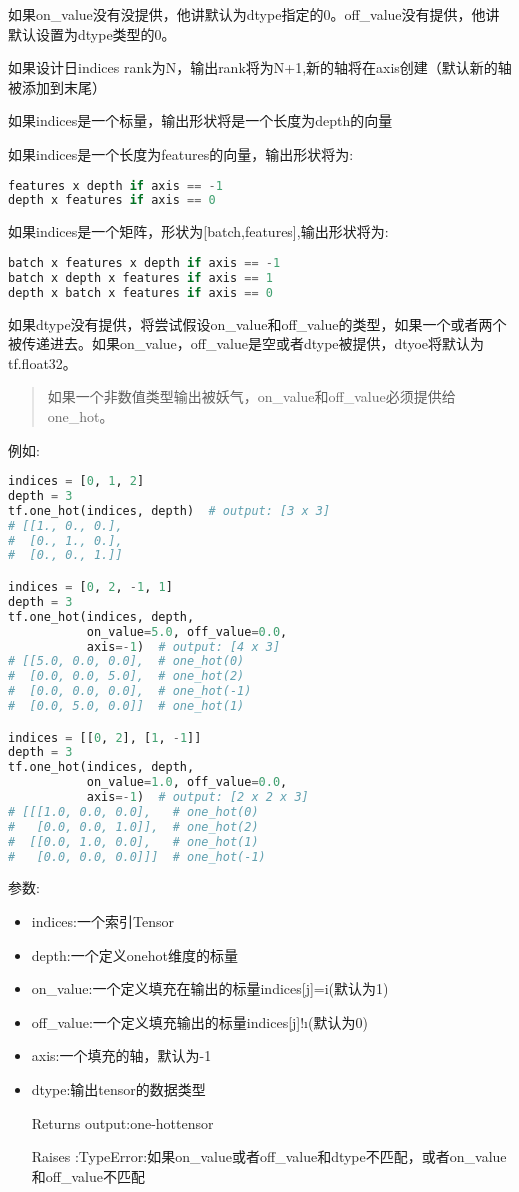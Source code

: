 如果on\_value没有没提供，他讲默认为dtype指定的0。off\_value没有提供，他讲默认设置为dtype类型的0。

如果设计日indices rank为N，输出rank将为N+1,新的轴将在axis创建（默认新的轴被添加到末尾）

如果indices是一个标量，输出形状将是一个长度为depth的向量

如果indices是一个长度为features的向量，输出形状将为:
\begin{lstlisting}[language=Python]
features x depth if axis == -1
depth x features if axis == 0
\end{lstlisting}
如果indices是一个矩阵，形状为[batch,features],输出形状将为:
\begin{lstlisting}[language=Python]
batch x features x depth if axis == -1
batch x depth x features if axis == 1
depth x batch x features if axis == 0
\end{lstlisting}
如果dtype没有提供，将尝试假设on\_value和off\_value的类型，如果一个或者两个被传递进去。如果on\_value，off\_value是空或者dtype被提供，dtyoe将默认为tf.float32。
\begin{quote}
如果一个非数值类型输出被妖气，on\_value和off\_value必须提供给one\_hot。
\end{quote}

例如:
\begin{lstlisting}[language=Python]
indices = [0, 1, 2]
depth = 3
tf.one_hot(indices, depth)  # output: [3 x 3]
# [[1., 0., 0.],
#  [0., 1., 0.],
#  [0., 0., 1.]]

indices = [0, 2, -1, 1]
depth = 3
tf.one_hot(indices, depth,
           on_value=5.0, off_value=0.0,
           axis=-1)  # output: [4 x 3]
# [[5.0, 0.0, 0.0],  # one_hot(0)
#  [0.0, 0.0, 5.0],  # one_hot(2)
#  [0.0, 0.0, 0.0],  # one_hot(-1)
#  [0.0, 5.0, 0.0]]  # one_hot(1)

indices = [[0, 2], [1, -1]]
depth = 3
tf.one_hot(indices, depth,
           on_value=1.0, off_value=0.0,
           axis=-1)  # output: [2 x 2 x 3]
# [[[1.0, 0.0, 0.0],   # one_hot(0)
#   [0.0, 0.0, 1.0]],  # one_hot(2)
#  [[0.0, 1.0, 0.0],   # one_hot(1)
#   [0.0, 0.0, 0.0]]]  # one_hot(-1)
\end{lstlisting}
参数:
\begin{itemize}
\item indices:一个索引Tensor
\item depth:一个定义onehot维度的标量
\item on\_value:一个定义填充在输出的标量indices[j]=i(默认为1)
\item off\_value:一个定义填充输出的标量indices[j]!\i(默认为0)
\item axis:一个填充的轴，默认为-1
\item dtype:输出tensor的数据类型
\item[Returns] output:one-hottensor
\item[Raises]:TypeError:如果on\_value或者off\_value和dtype不匹配，或者on\_value和off\_value不匹配
\end{itemize}

